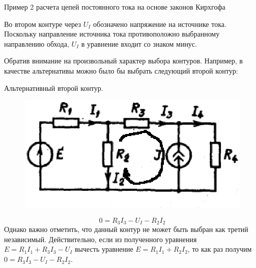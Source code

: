 \documentclass[10pt, pdf, hyperref={unicode},handout]{beamer}
\begin{document}
\begin{frame}{Пример 2  расчета цепей постоянного тока на основе законов Кирхгофа}
  \begin{block}

    \small{
      Во втором контуре через $U_{I}$ обозначено напряжение на источнике тока. Поскольку направление источника тока противоположно выбранному направлению обхода, $U_{I}$ в уравнение входит со знаком минус. 

      Обратив внимание на произвольный характер выбора контуров. Например, в качестве альтернативы можно было бы выбрать следующий второй контур:

      Альтернативный второй контур.
      \begin{figure}[htb] 
    \centering
    \includegraphics [scale=0.9]{ris13.eps}
  \end{figure}
  $$0=R_3I_3-U_{I}-R_2I_2$$
  Однако важно отметить, что данный контур не может быть выбран как третий независимый. Действительно, если из полученного уравнения $E=R_1I_1+R_3I_3-U_{I}$ вычесть уравнение $E=R_1I_1+R_2I_2$, то как раз получим $0=R_3I_3-U_{I}-R_2I_2$.
}
  \end{block}
  
\end{frame}
\end{document}
